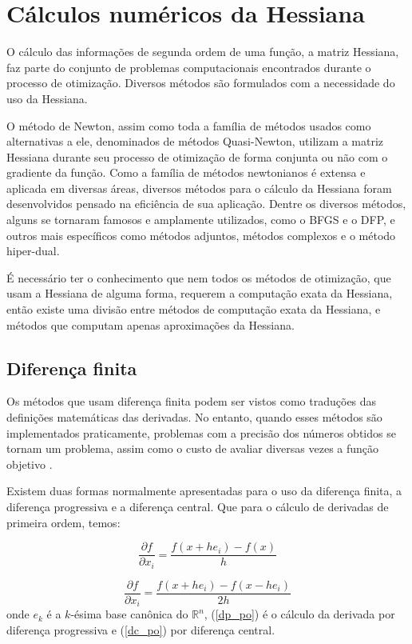\section{Cálculos numéricos da Hessiana}

\noindent
O cálculo das informações de segunda ordem de uma função, a matriz Hessiana, faz parte do conjunto
de problemas computacionais encontrados durante o processo de otimização. Diversos métodos são
formulados com a necessidade do uso da Hessiana.

O método de Newton, assim como toda a família de métodos usados como alternativas a ele,
denominados de métodos Quasi-Newton, utilizam a matriz Hessiana durante seu processo de otimização
de forma conjunta ou não com o gradiente da função. Como a família de métodos newtonianos é extensa e
aplicada em diversas áreas, diversos métodos para o cálculo da Hessiana foram desenvolvidos
pensado na eficiência de sua aplicação. Dentre os diversos métodos, alguns se tornaram famosos
e amplamente utilizados, como o BFGS e o DFP, e outros mais específicos como métodos adjuntos,
métodos complexos e o método hiper-dual.

É necessário ter o conhecimento que nem todos os métodos de otimização, que usam a Hessiana de
alguma forma, requerem a computação exata da Hessiana, então existe uma divisão entre métodos
de computação exata da Hessiana, e métodos que computam apenas aproximações da Hessiana.


\subsection{Diferença finita}

\noindent
Os métodos que usam diferença finita podem ser vistos como traduções das definições matemáticas
das derivadas. No entanto, quando esses métodos são implementados praticamente, problemas com a
precisão dos números obtidos se tornam um problema, assim como o custo de avaliar diversas
vezes a função objetivo \cite{caplan2011numerical}.

Existem duas formas normalmente apresentadas para o uso da diferença finita, a diferença
progressiva e a diferença central. Que para o cálculo de derivadas de primeira ordem, temos:


\begin{equation}
\label{dp_po}
\frac{\partial f}{\partial x_i} = \frac{f(x+he_i) - f(x)}{h}
\end{equation}

\begin{equation}
\label{dc_po}
\frac{\partial f}{\partial x_i} = \frac{f(x+he_i) - f(x - he_i)}{2h}
\end{equation}
onde \(e_k\) é a \(k\)-ésima base canônica do \(\mathbb{R}^n\), (\ref{dp_po}) é o cálculo
da derivada por diferença progressiva e (\ref{dc_po}) por diferença central.

